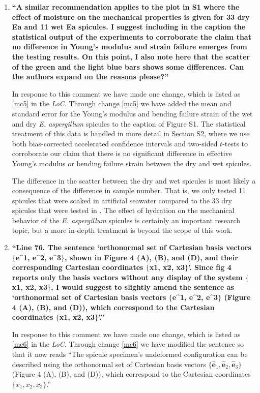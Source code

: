 \documentclass[11pt,letterpaper]{report}
\newcommand{\ex}{{\bm{\hat{e}}}_1}
\newcommand{\ey}{{\bm{\hat{e}}}_2}
\newcommand{\ez}{{\bm{\hat{e}}}_3}
\begin{document}
\begin{enumerate}[label=\textit{2.\arabic*},wide, labelwidth=!, labelindent=0pt]
\item \label{r2c8} {\bf ``A similar recommendation applies to the plot in S1 where the effect of moisture on the mechanical properties is given for 33 dry Ea and 11 wet Ea spicules. I suggest including in the caption the statistical output of the experiments to corroborate the claim that no difference in Young's modulus and strain failure emerges from the testing results. On this point, I also note here that the scatter of the green and the light blue bars shows some differences. Can the authors expand on the reasons please?''}

In response to this comment we have made one change, which is listed as \ref{mc5} in the \textit{LoC}.
%
Through change \ref{mc5} we have added the mean and standard error for the Young's modulus and bending failure strain of the wet and dry \textit{E. aspergillum} spicules to the caption of Figure S1. The statistical treatment of this data is handled in more detail in Section S2, where we use both bias-corrected accelerated confidence intervals and two-sided $t$-tests to corroborate our claim that there is no significant difference in effective Young's modulus or bending failure strain between the dry and wet spicules.

The difference in the scatter between the dry and wet spicules is most likely a consequence of the difference in sample number. That is, we only tested 11 spicules that were soaked in artificial seawater compared to the 33 dry spicules that were tested in \cite{monn2017enhanced}. The effect of hydration on the mechanical behavior of the \textit{E. aspergillum} spicules is certainly an important research topic, but a more in-depth treatment is beyond the scope of this work.

\item \label{r2c9} {\bf ``Line 76. The sentence `orthonormal set of Cartesian basis vectors $\{$e\string^1, e\string^2, e\string^3$\}$, shown in Figure 4 (A), (B), and (D), and their corresponding Cartesian coordinates $\{$x1, x2, x3$\}$'. Since fig 4 reports only the basis vectors without any display of the system $\{$x1, x2, x3$\}$, I would suggest to slightly amend the sentence as `orthonormal set of Cartesian basis vectors $\{$e\string^1, e\string^2, e\string^3$\}$ (Figure 4 (A), (B), and (D)), which correspond to the Cartesian coordinates $\{$x1, x2, x3$\}$'.''}

In response to this comment we have made one change, which is listed as \ref{mc6} in the \textit{LoC}.
%
Through change \ref{mc6} we have modified the sentence so that it now reads ``The spicule specimen's undeformed configuration can be described using the orthonormal set of Cartesian basis vectors $\{\ex,\ey,\ez\}$ (Figure 4 (A), (B), and (D)), which correspond to the Cartesian coordinates $\{x_1,x_2,x_3\}$.''


\end{enumerate}
\end{document}

